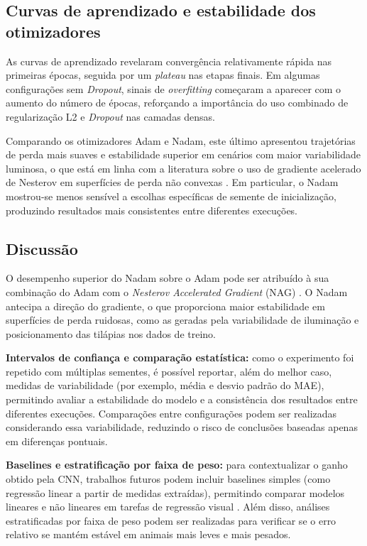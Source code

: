 \documentclass[sigconf,nonacm,screen]{acmart}
\begin{document}
\subsection{Curvas de aprendizado e estabilidade dos otimizadores}
As curvas de aprendizado revelaram convergência relativamente rápida nas primeiras épocas, seguida por um \textit{plateau} nas etapas finais. Em algumas configurações sem \textit{Dropout}, sinais de \textit{overfitting} começaram a aparecer com o aumento do número de épocas, reforçando a importância do uso combinado de regularização L2 e \textit{Dropout} nas camadas densas.

Comparando os otimizadores Adam e Nadam, este último apresentou trajetórias de perda mais suaves e estabilidade superior em cenários com maior variabilidade luminosa, o que está em linha com a literatura sobre o uso de gradiente acelerado de Nesterov em superfícies de perda não convexas \cite{Ruder2016}. Em particular, o Nadam mostrou-se menos sensível a escolhas específicas de semente de inicialização, produzindo resultados mais consistentes entre diferentes execuções.

\subsection{Discussão}
O desempenho superior do Nadam sobre o Adam pode ser atribuído à sua combinação do Adam com o \textit{Nesterov Accelerated Gradient} (NAG) \cite{Ruder2016}. O Nadam antecipa a direção do gradiente, o que proporciona maior estabilidade em superfícies de perda ruidosas, como as geradas pela variabilidade de iluminação e posicionamento das tilápias nos dados de treino.

\textbf{Intervalos de confiança e comparação estatística:} como o experimento foi repetido com múltiplas sementes, é possível reportar, além do melhor caso, medidas de variabilidade (por exemplo, média e desvio padrão do MAE), permitindo avaliar a estabilidade do modelo e a consistência dos resultados entre diferentes execuções. Comparações entre configurações podem ser realizadas considerando essa variabilidade, reduzindo o risco de conclusões baseadas apenas em diferenças pontuais.

\textbf{Baselines e estratificação por faixa de peso:} para contextualizar o ganho obtido pela CNN, trabalhos futuros podem incluir baselines simples (como regressão linear a partir de medidas extraídas), permitindo comparar modelos lineares e não lineares em tarefas de regressão visual \cite{Goodfellow2016}. Além disso, análises estratificadas por faixa de peso podem ser realizadas para verificar se o erro relativo se mantém estável em animais mais leves e mais pesados.
\end{document}

